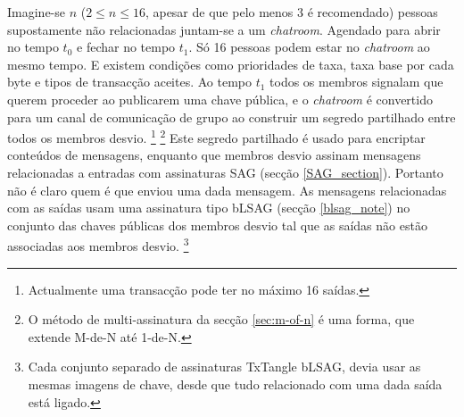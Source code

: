 Imagine-se $n$ ($2 \leq n \leq 16$, apesar de que pelo menos 3 é recomendado)
pessoas supostamente não relacionadas juntam-se a um {\em chatroom}. Agendado para abrir no tempo $t_0$ e fechar no tempo $t_1$. Só 16 pessoas podem estar no {\em chatroom} ao mesmo tempo. E existem condições como prioridades de taxa, taxa base por cada byte e tipos de transacção aceites. Ao tempo $t_1$ todos os membros signalam que querem proceder ao publicarem uma chave pública, e o {\em chatroom} é convertido para um canal de comunicação de grupo ao construir um segredo partilhado entre todos os membros desvio.   
\footnote{Actualmente uma transacção pode ter no máximo 16 saídas.}
\footnote{O método de multi-assinatura da secção \ref{sec:m-of-n} é uma forma, que extende M-de-N até 1-de-N.}
Este segredo partilhado é usado para encriptar conteúdos de mensagens, enquanto que membros desvio assinam mensagens relacionadas a entradas com assinaturas SAG (secção \ref{SAG_section}). Portanto não é claro quem é que enviou uma dada mensagem.
\newline As mensagens relacionadas com as saídas usam uma assinatura tipo bLSAG (secção \ref{blsag_note}) no conjunto das chaves públicas dos membros desvio tal que as saídas não estão associadas aos membros desvio.    
\footnote{Cada conjunto separado de assinaturas TxTangle bLSAG, devia usar as mesmas imagens de chave, desde que tudo relacionado com uma dada saída está ligado.}



